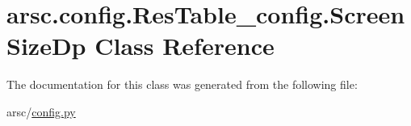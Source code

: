 \hypertarget{classarsc_1_1config_1_1ResTable__config_1_1ScreenSizeDp}{}\section{arsc.\+config.\+Res\+Table\+\_\+config.\+Screen\+Size\+Dp Class Reference}
\label{classarsc_1_1config_1_1ResTable__config_1_1ScreenSizeDp}


The documentation for this class was generated from the following file\+:\begin{DoxyCompactItemize}
\item 
arsc/\mbox{\hyperlink{config_8py}{config.\+py}}\end{DoxyCompactItemize}
